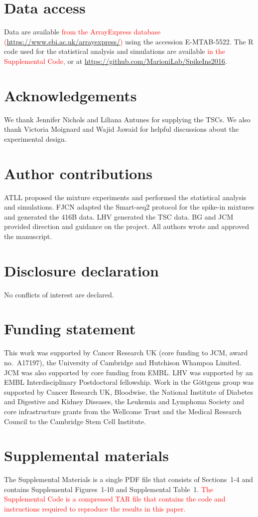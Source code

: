 \documentclass{article}
\newcommand{\suppfigindex}{10}
\newcommand{\suppsecsim}{4}
\newcommand{\revised}[1]{\textcolor{red}{#1}}
\begin{document}
\section*{Data access}
Data are available \revised{from the ArrayExpress database (\url{https://www.ebi.ac.uk/arrayexpress/})} using the accession E-MTAB-5522.
The R code used for the statistical analysis and simulations are available \revised{in the Supplemental Code,} or at \url{https://github.com/MarioniLab/SpikeIns2016}.

\section*{Acknowledgements}
We thank Jennifer Nichols and Liliana Antunes for supplying the TSCs.
We also thank Victoria Moignard and Wajid Jawaid for helpful discussions about the experimental design.

\section*{Author contributions}
ATLL proposed the mixture experiments and performed the statistical analysis and simulations.
FJCN adapted the Smart-seq2 protocol for the spike-in mixtures and generated the 416B data.
LHV generated the TSC data.
BG and JCM provided direction and guidance on the project.
All authors wrote and approved the manuscript.

\section*{Disclosure declaration}
No conflicts of interest are declared.

\section*{Funding statement}
This work was supported by Cancer Research UK (core funding to JCM, award no.\ A17197), the University of Cambridge and Hutchison Whampoa Limited.
JCM was also supported by core funding from EMBL.
LHV was supported by an EMBL Interdisciplinary Postdoctoral fellowship.
Work in the G\"ottgens group was supported by Cancer Research UK, Bloodwise, the National Institute of Diabetes and Digestive and Kidney Diseases, the Leukemia and Lymphoma Society and core infrastructure grants from the Wellcome Trust and the Medical Research Council to the Cambridge Stem Cell Institute.

\section*{Supplemental materials}
The Supplemental Materials is a single PDF file that consists of Sections~1-\suppsecsim{} and contains Supplemental Figures~1-\suppfigindex{} and Supplemental Table~1.
\revised{The Supplemental Code is a compressed TAR file that contains the code and instructions required to reproduce the results in this paper.}

\printbibliography
\end{document}
